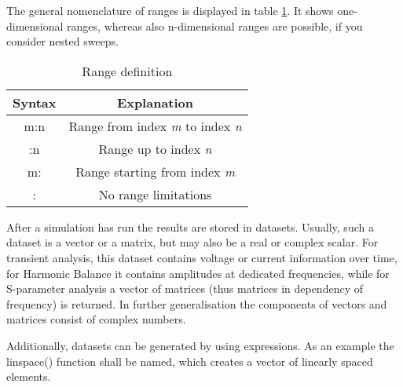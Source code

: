 The general nomenclature of ranges is displayed in table \ref{table:Range-definition}.
It shows one-dimensional ranges, whereas also n-dimensional ranges
are possible, if you consider nested sweeps.

%
\begin{table}
\begin{center}\begin{tabular}{|c|c|}
\hline 
Syntax&
Explanation\tabularnewline
\hline
\hline 
m:n&
Range from index \textit{m} to index \textit{n}\tabularnewline
\hline 
:n&
Range up to index \textit{n}\tabularnewline
\hline 
m:&
Range starting from index \textit{m}\tabularnewline
\hline 
:&
No range limitations\tabularnewline
\hline
\end{tabular}\end{center}


\caption{\label{table:Range-definition}Range definition}
\end{table}




After a simulation has run the results are stored in datasets. Usually,
such a dataset is a vector or a matrix, but may also be a real or
complex scalar. For transient analysis, this dataset contains voltage
or current information over time, for Harmonic Balance it contains
amplitudes at dedicated frequencies, while for S-parameter analysis
a vector of matrices (thus matrices in dependency of frequency) is
returned. In further generalisation the components of vectors and
matrices consist of complex numbers.

Additionally, datasets can be generated by using expressions. As an
example the linspace() function shall be named, which creates a vector
of linearly spaced elements.
